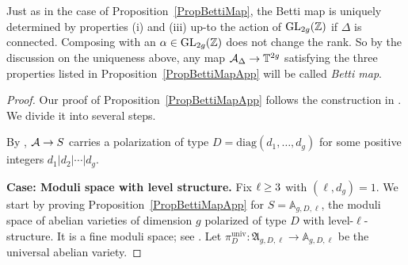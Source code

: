 Just as in the case of
Proposition~\ref{PropBettiMap}, the Betti map
is uniquely determined  by properties (i) and (iii)
up-to the action of $\mathrm{GL}_{2g}({\mathbb{Z}})$ if $\Delta$ is
connected. 
 Composing with an $\alpha \in \mathrm{GL}_{2g}({\mathbb{Z}})$ does not change the rank. So by the discussion on the uniqueness above, any map $\mathcal{A}_{\Delta} \rightarrow \mathbb{T}^{2g}$ satisfying the three properties listed in Proposition~\ref{PropBettiMapApp} will be called \textit{Betti map}.%
\begin{proof} Our proof of Proposition~\ref{PropBettiMapApp} follows the construction in \cite[$\mathsection$3-$\mathsection$4]{GaoBettiRank}. We divide it into several steps.

By \cite[$\mathsection$2.1]{GenestierNgo}, $\mathcal{A} \rightarrow S$ carries a polarization of type $D = \mathrm{diag}(d_1,\ldots,d_g)$ for some positive integers $d_1|d_2|\cdots|d_g$.

  \textbf{Case: Moduli space with level structure.} 
Fix $\ell \ge 3$ with $(\ell,d_g) = 1$. We start by proving Proposition~\ref{PropBettiMapApp} for $S = \mathbb
A_{g,D,\ell}$, the moduli space of abelian varieties of
dimension $g$ polarized of type $D$ with level-$\ell$-structure. It is a fine moduli
space; see \cite[Theorem~2.3.1]{GenestierNgo}. Let $\pi^{\mathrm{univ}}_D \colon \mathfrak{A}_{g,D,\ell} \rightarrow \mathbb A_{g,D,\ell}$ be the universal abelian variety.


\end{proof}
